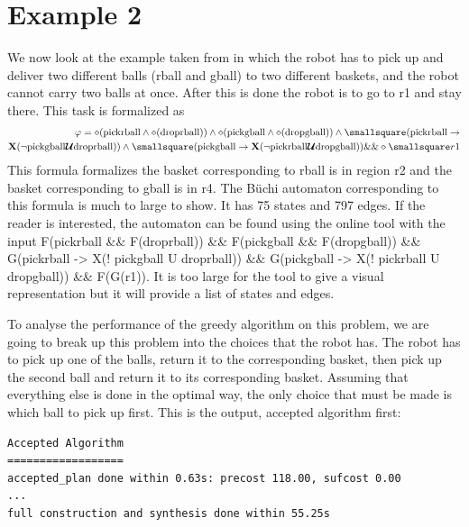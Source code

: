 \section{Example 2}
We now look at the example taken from \cite{guo15} in which the robot has to pick up and deliver two different balls (rball and gball) to two different baskets, and the robot cannot carry two balls at once. After this is done the robot is to go to r1 and stay there. This task is formalized as 
\begin{align*}
\varphi = \diamond (\text{pickrball} \wedge \diamond (\text{droprball})) \wedge \diamond(\text{pickgball} \wedge \diamond (\text{dropgball})) \wedge \smallsquare (\text{pickrball} \rightarrow \\
 \textbf{X}(\neg \text{pickgball} \U \text{droprball})) \wedge \smallsquare (\text{pickgball} \rightarrow \textbf{X} (\neg \text{pickrball} \U \text{dropgball})) \&\& \diamond \smallsquare r1
\end{align*}
This formula formalizes the basket corresponding to rball is in region r2 and the basket corresponding to gball is in r4. The B\"uchi automaton corresponding to this formula is much to large to show. It has 75 states and 797 edges. If the reader is interested, the automaton can be found using the online tool \cite{ltlbuchiwebsite} with the input F(pickrball \&\& F(droprball)) \&\& F(pickgball \&\& F(dropgball)) \&\& G(pickrball -> X(! pickgball U droprball)) \&\& G(pickgball -> X(! pickrball U dropgball)) \&\& F(G(r1)). It is too large for the tool to give a visual representation but it will provide a list of states and edges.  

To analyse the performance of the greedy algorithm on this problem, we are going to break up this problem into the choices that the robot has. The robot has to pick up one of the balls, return it to the corresponding basket, then pick up the second ball and return it to its corresponding basket. Assuming that everything else is done in the optimal way, the only choice that must be made is which ball to pick up first. This is the output, accepted algorithm first: \\


\begin{minipage}{\textwidth}
\begingroup
\fontsize{9pt}{12pt}\selectfont
\begin{lstlisting}
Accepted Algorithm
==================
accepted_plan done within 0.63s: precost 118.00, sufcost 0.00
...
full construction and synthesis done within 55.25s 
\end{lstlisting}
\endgroup
\end{minipage} \\ \\


